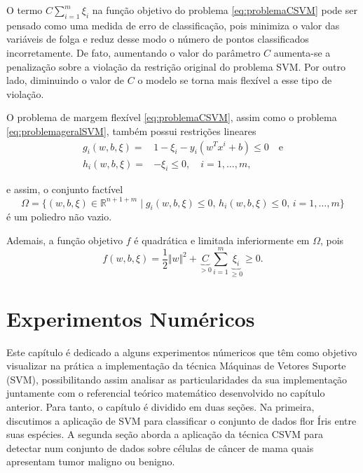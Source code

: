 \documentclass[12pt,a4paper]{scrartcl}
\def\RR{\mathds{R}}
\theoremstyle{definition}%
\begin{document}
O termo $C \sum_{i=1}^{m} \xi_{i}$ na função objetivo do problema \eqref{eq:problemaCSVM} pode ser pensado como uma medida de erro de classificação, pois minimiza o valor das variáveis de folga e reduz desse modo o número de pontos classificados incorretamente. De fato, aumentando o valor do parâmetro $C$ aumenta-se a penalização sobre a violação da restrição original do problema SVM. Por outro lado, diminuindo o valor de $C$ o modelo se torna mais flexível a esse tipo de violação. 

O problema de margem flexível \eqref{eq:problemaCSVM}, assim como o problema \eqref{eq:problemageralSVM}, também possui restrições lineares 
\begin{align} 
g_{i}(w,b,\xi) = & 1-\xi_{i} - y_i(w^{T}x^{i}+b) \leq 0 \quad \text{e} \\
h_{i}(w,b,\xi) = & - \xi_{i} \leq 0, \quad i=1, \ldots, m,
\end{align}

e assim, o conjunto factível
\[
\Omega = \{(w,b,\xi) \in \RR^{n+1+m} \mid g_{i}(w,b,\xi) \leq 0, \, h_{i}(w,b,\xi) \leq 0, \, i=1, \ldots, m \} 
\]
é um poliedro não vazio.

Ademais, a função objetivo $f$ é quadrática e limitada inferiormente em $\Omega$, pois 
\[
f(w,b,\xi) = \dfrac{1}{2} \Vert w\Vert^{2} + \underbrace{C}_{> 0} \sum_{i=1}^{m} \underbrace{\xi_{i}}_{\geq 0} \geq 0.
\]



\newpage
\section{Experimentos Numéricos} \label{chap:experimentos_numericos}


    Este capítulo é dedicado a alguns experimentos númericos que têm como
objetivo visualizar na prática a implementação da técnica Máquinas de
Vetores Suporte (SVM), possibilitando assim analisar as particularidades
da sua implementação juntamente com o referencial teórico matemático
desenvolvido no capítulo anterior. Para tanto, o capítulo é dividido em
duas seções. Na primeira, discutimos a aplicação de SVM para classificar
o conjunto de dados flor Íris entre suas espécies. A segunda seção
aborda a aplicação da técnica CSVM para detectar num conjunto de dados
sobre células de câncer de mama quais apresentam tumor maligno ou
benigno.
\end{document}
